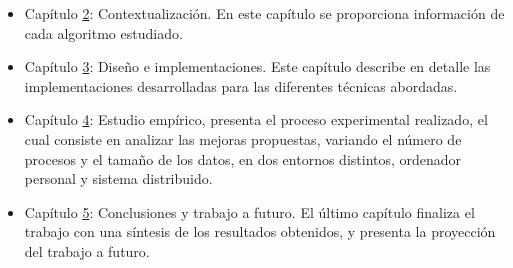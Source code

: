 	
	\begin{itemize}
		\item Capítulo \hyperref[cap:c2_context]{2}: Contextualización. En este capítulo se proporciona información de cada algoritmo estudiado.
		\item Capítulo \hyperref[cap:c3_implementaciones]{3}: Diseño e implementaciones. Este capítulo describe en detalle las implementaciones desarrolladas para las diferentes técnicas abordadas.
		\item Capítulo \hyperref[cap:c4_estudio]{4}: Estudio empírico, presenta el proceso experimental realizado, el cual consiste en analizar las mejoras propuestas, variando el número de procesos y el tamaño de los datos, en dos entornos distintos, ordenador personal y sistema distribuido.
		\item Capítulo \hyperref[cap:c5_conclu]{5}: Conclusiones y trabajo a futuro. El último capítulo finaliza el trabajo con una síntesis  de los resultados obtenidos, y presenta la proyección del trabajo a futuro.
	\end{itemize}

















